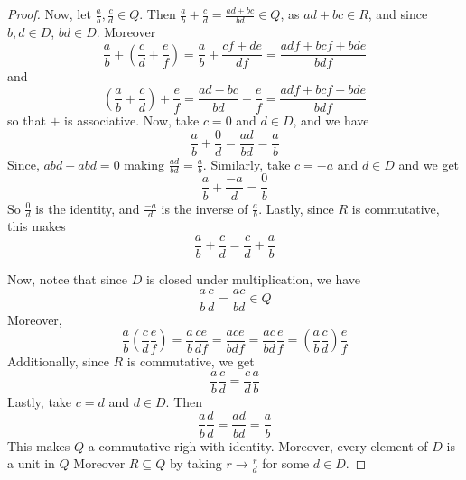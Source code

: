 \begin{proof}
    Now, let  $\frac{a}{b},\frac{c}{d} \in Q$. Then
    $\frac{a}{b}+\frac{c}{d}=\frac{ad+bc}{bd} \in Q$, as $ad+bc \in R$, and
    since  $b,d \in D$,  $bd \in D$. Moreover
    \begin{equation*}
        \frac{a}{b}+(\frac{c}{d}+\frac{e}{f})=\frac{a}{b}+\frac{cf+de}{df}
        =\frac{adf+bcf+bde}{bdf}
    \end{equation*}
    and
    \begin{equation*}
        (\frac{a}{b}+\frac{c}{d})+\frac{e}{f}=\frac{ad-bc}{bd}+\frac{e}{f}
        =\frac{adf+bcf+bde}{bdf}
    \end{equation*}
    so that $+$ is associative. Now, take  $c=0$ and  $d \in D$, and we have
    \begin{equation*}
        \frac{a}{b}+\frac{0}{d}=\frac{ad}{bd}=\frac{a}{b}
    \end{equation*}
    Since, $abd-abd=0$ making $\frac{ad}{bd}=\frac{a}{b}$. Similarly, take
    $c=-a$ and  $d \in D$ and we get
    \begin{equation*}
        \frac{a}{b}+\frac{-a}{d}=\frac{0}{b}
    \end{equation*}
    So $\frac{0}{d}$ is the identity, and $\frac{-a}{d}$ is the inverse of
    $\frac{a}{b}$. Lastly, since $R$ is commutative, this makes
    \begin{equation*}
        \frac{a}{b}+\frac{c}{d}=\frac{c}{d}+\frac{a}{b}
    \end{equation*}

    Now, notce that since $D$ is closed under multiplication, we have
    \begin{equation*}
        \frac{a}{b}\frac{c}{d}=\frac{ac}{bd} \in Q
    \end{equation*}
    Moreover,
    \begin{equation*}
        \frac{a}{b}(\frac{c}{d}\frac{e}{f})=\frac{a}{b}\frac{ce}{df}=\frac{ace}{bdf}
        =\frac{ac}{bd}\frac{e}{f}=(\frac{a}{b}\frac{c}{d})\frac{e}{f}
    \end{equation*}
    Additionally, since $R$ is commutative, we get
    \begin{equation*}
        \frac{a}{b}\frac{c}{d}=\frac{c}{d}\frac{a}{b}
    \end{equation*}
    Lastly, take $c=d$ and  $d \in D$. Then
    \begin{equation*}
        \frac{a}{b}\frac{d}{d}=\frac{ad}{bd}=\frac{a}{b}
    \end{equation*}
    This makes $Q$ a commutative righ with identity. Moreover, every element of
     $D$ is a unit in $Q$ Moreover $R \subseteq Q$ by taking $r \xrightarrow{}
     \frac{r}{d}$ for some $d \in D$.
\end{proof}
